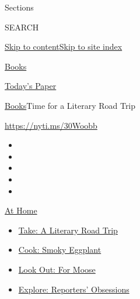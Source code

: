 Sections

SEARCH

\protect\hyperlink{site-content}{Skip to
content}\protect\hyperlink{site-index}{Skip to site index}

\href{https://www.nytimes3xbfgragh.onion/section/books}{Books}

\href{https://myaccount.nytimes3xbfgragh.onion/auth/login?response_type=cookie\&client_id=vi}{}

\href{https://www.nytimes3xbfgragh.onion/section/todayspaper}{Today's
Paper}

\href{/section/books}{Books}\textbar{}Time for a Literary Road Trip

\url{https://nyti.ms/30Woobb}

\begin{itemize}
\item
\item
\item
\item
\item
\end{itemize}

\href{https://www.nytimes3xbfgragh.onion/spotlight/at-home?action=click\&pgtype=Article\&state=default\&region=TOP_BANNER\&context=at_home_menu}{At
Home}

\begin{itemize}
\tightlist
\item
  \href{https://www.nytimes3xbfgragh.onion/2020/07/28/books/time-for-a-literary-road-trip.html?action=click\&pgtype=Article\&state=default\&region=TOP_BANNER\&context=at_home_menu}{Take:
  A Literary Road Trip}
\item
  \href{https://www.nytimes3xbfgragh.onion/2020/07/29/magazine/bored-with-your-home-cooking-some-smoky-eggplant-will-fix-that.html?action=click\&pgtype=Article\&state=default\&region=TOP_BANNER\&context=at_home_menu}{Cook:
  Smoky Eggplant}
\item
  \href{https://www.nytimes3xbfgragh.onion/2020/07/27/travel/moose-michigan-isle-royale.html?action=click\&pgtype=Article\&state=default\&region=TOP_BANNER\&context=at_home_menu}{Look
  Out: For Moose}
\item
  \href{https://www.nytimes3xbfgragh.onion/interactive/2020/at-home/even-more-reporters-editors-diaries-lists-recommendations.html?action=click\&pgtype=Article\&state=default\&region=TOP_BANNER\&context=at_home_menu}{Explore:
  Reporters' Obsessions}
\end{itemize}

